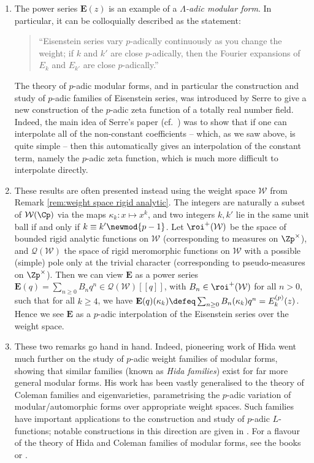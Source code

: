 \documentclass[a4paper,10pt, english, reqno]{smfart}
\newcommand{\lsem}{[\! [}
\newcommand{\rsem}{]\! ]}
\newcommand{\cW}{\mathcal{W}}
\numberwithin{equation}{section}
\begin{document}
\begin{remarks}\leavevmode
\begin{enumerate}

\item The power series $\mathbf{E}(z)$ is an example of a \emph{$\Lambda$-adic modular form}. In particular, it can be colloquially described as the statement:
\begin{quote}
``Eisenstein series vary $p$-adically continuously as you change the weight; if $k$ and $k'$ are close $p$-adically, then the Fourier expansions of $E_k$ and $E_{k'}$ are close $p$-adically.''
\end{quote}
The theory of $p$-adic modular forms, and in particular the construction and study of $p$-adic families of Eisenstein series, was introduced by Serre \cite{SerreFormesModulairesetZeta} to give a new construction of the $p$-adic zeta function of a totally real number field.  Indeed, the main idea of Serre's paper (cf.\ \cite[Corollaire 2]{SerreFormesModulairesetZeta}) was to show that if one can interpolate all of the non-constant coefficients -- which, as we saw above, is quite simple -- then this automatically gives an interpolation of the constant term, namely the $p$-adic zeta function, which is much more difficult to interpolate directly.


	\item These results are often presented instead using the weight space $\cW$ from Remark \ref{rem:weight space rigid analytic}. The integers are naturally a subset of $\mathcal{W}(\Cp)$ via the maps $\kappa_k : x \mapsto x^k$, and two integers $k, k'$ lie in the same unit ball if and only if $k \equiv k' \newmod{p-1}$. Let $\roi^+(\cW)$ be the space of bounded rigid analytic functions on $\cW$ (corresponding to measures on $\Zp^\times$), and $\mathcal{Q}(\cW)$ the space of rigid meromorphic functions on $\cW$ with a possible (simple) pole only at the trivial character (corresponding to pseudo-measures on $\Zp^\times$). Then we can view $\mathbf{E}$ as a power series $\mathbf{E}(q) = \sum_{n \geq 0} B_n q^n \in \mathcal{Q}(\cW)\lsem q\rsem$, with $B_n \in \roi^+(\cW)$ for all $n>0$, such that for all $k\geq 4$, we have $\mathbf{E}(q)(\kappa_k)\defeq \sum_{n\geq 0}B_n(\kappa_k) q^n = E_k^{(p)}(z)$. Hence we see $\mathbf{E}$ as a $p$-adic interpolation of the Eisenstein series over the weight space.


\item These two remarks go hand in hand. Indeed, pioneering work of Hida went much further on the study of $p$-adic weight families of modular forms, showing that similar families (known as \emph{Hida families}) exist for far more general modular forms. His work has been vastly generalised to the theory of Coleman families and eigenvarieties, parametrising the $p$-adic variation of modular/automorphic forms over appropriate weight spaces. Such families have important applications to the construction and study of $p$-adic $L$-functions; notable constructions in this direction are given in \cite{PS12, Bel12}. For a flavour of the theory of Hida and Coleman families of modular forms, see the books \cite{HidE} or \cite{Eigenbook}. 
\end{enumerate}
\end{remarks}
\end{document}

